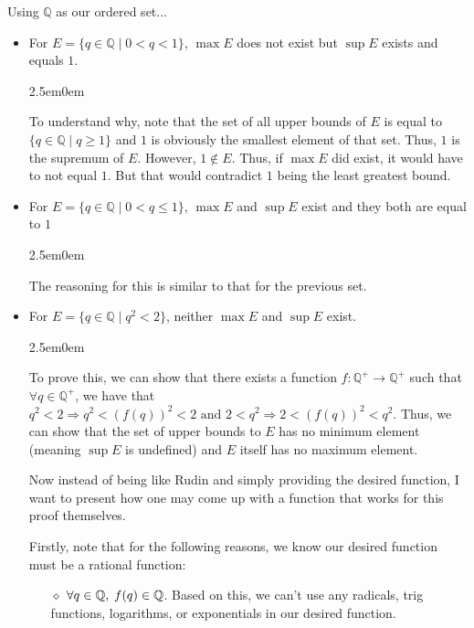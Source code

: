 \documentclass{book}
\newcommand{\exOne}{%
   \color{Purple}%
   \fontsize{14}{14}\selectfont%
}
\newcommand{\exP}{%
   \color{VioletRed}%
   \fontsize{12}{12}\selectfont%
}
\newenvironment{myIndent}{%
   \begin{adjustwidth}{2.5em}{0em}%
}{%
   \end{adjustwidth}%
}
\begin{document}
   \pagebreak
   \exOne
   Using $\mathbb{Q}$ as our ordered set...
   \begin{itemize}
      \item For $E = \{q \in \mathbb{Q} \mid 0<q<1\}$,
      $\max{E}$ does not exist but $\sup{E}$ exists and equals $1$.
      \exP
      \begin{myIndent}
         To understand why, note that the set of all upper bounds
         of $E$ is equal to\\ $\{q \in \mathbb{Q} \mid q \geq 1\}$ and 
         $1$ is obviously the smallest element of that set. Thus, $1$
         is the supremum of $E$. However, $1 \notin E$. Thus, if
         $\max{E}$ did exist, it would have to not equal $1$. But that
         would contradict $1$ being the least greatest bound.
      \end{myIndent}
      \hfill \bigbreak

      \exOne
      \item For $E = \{q \in \mathbb{Q} \mid 0<q \leq 1\}$,
      $\max{E}$ and $\sup{E}$ exist and they both are equal to $1$
      \exP
      \begin{myIndent}
         The reasoning for this is similar to that for the previous set.
      \end{myIndent}
      \hfill \bigbreak
      
      \exOne
      \item For $E = \{q \in \mathbb{Q} \mid q^2 < 2\}$, neither
      $\max{E}$ and $\sup{E}$ exist.
      \exP
      \begin{myIndent}
         To prove this, we can show that there exists a function $f: 
         \mathbb{Q}^+ \rightarrow \mathbb{Q}^+$ such that
         $\forall q \in \mathbb{Q}^+$, we have that $q^2 < 2
         \Rightarrow q^2 < (f(q))^2 < 2 \text{ and } 2 < q^2
         \Rightarrow 2 < (f(q))^2 < q^2$. Thus, we can show that
         the set of upper bounds to $E$ has no minimum element (meaning
         $\sup{E}$ is undefined) and $E$ itself has no maximum element.
         \hfill \bigbreak


         Now instead of being like Rudin and simply providing the desired
         function, I want to present how one may come up with a function 
         that works for this proof themselves.
         \hfill \bigbreak

         Firstly, note that for the following reasons, we know our 
         desired function must be a rational function:
         \begin{itemize}
            \item[$\diamond$] $\forall q \in \mathbb{Q}, \hspace{0.25em} 
            f(q) \in \mathbb{Q}$. Based on this, we can't use any radicals,
            trig functions, logarithms, or exponentials in our desired
            function. \hfill \bigbreak


\end{itemize}
\end{myIndent}
\end{itemize}
\end{document}
